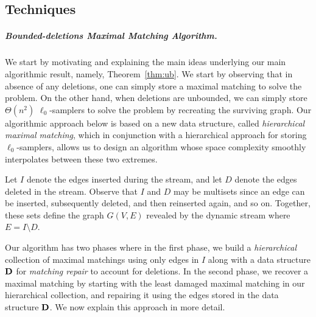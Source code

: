 \documentclass[11pt,a4paper]{article}
\newcommand{\D}{\mathsf{\bf D}}
\begin{document}
\subsection{Techniques}
\label{subsec:Techniques}
\subparagraph{Bounded-deletions  \textsf{Maximal Matching} Algorithm.}
We start by motivating and explaining the main ideas underlying our main algorithmic result, namely, Theorem~\ref{thm:ub}. We start by observing that in absence of any deletions, one can simply store a maximal matching to solve the problem. On the other hand, when deletions are unbounded, we can simply store $\Theta(n^2)$ 
$\ell_0$-samplers to solve the problem by recreating the surviving graph. Our algorithmic approach below is based on a new data structure, called {\em hierarchical maximal matching}, which in conjunction with a hierarchical approach for storing $\ell_0$-samplers, allows us to design an algorithm whose space complexity smoothly interpolates between these two extremes.


Let $I$ denote the edges inserted during the stream, and let $D$ denote the edges deleted in the stream. Observe that $I$ and $D$ may be multisets since an edge can be inserted, subsequently deleted, and then reinserted again, and so on. Together, these sets define the graph $G(V,E)$ revealed by the dynamic stream where $E = I \setminus D$.

 Our algorithm has two phases where in the first phase, we build a {\em hierarchical} collection of maximal matchings using only edges in $I$ along with a data structure $\D$ for {\em matching repair} to account for deletions. In the second phase, we recover a maximal matching by starting with the least damaged maximal matching in our hierarchical collection, and repairing it using the edges stored in the data structure $\D$. We now explain this approach in more detail.
\end{document}
